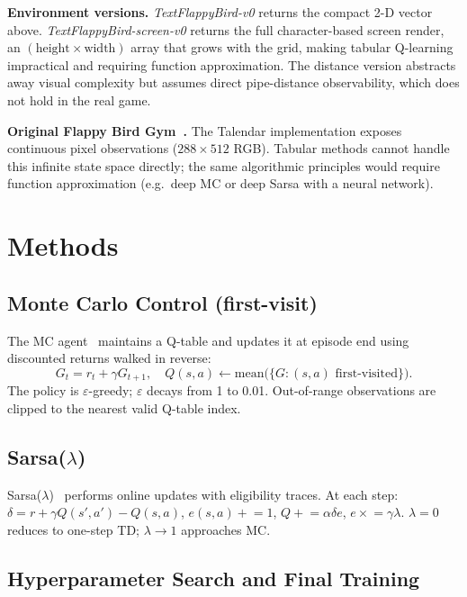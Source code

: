 \documentclass[runningheads]{llncs}
\begin{document}
\textbf{Environment versions.}
\emph{TextFlappyBird-v0} returns the compact 2-D vector above.
\emph{TextFlappyBird-screen-v0} returns the full character-based screen
render, an $(\text{height}\times\text{width})$ array that grows with the
grid, making tabular Q-learning impractical and requiring function
approximation.
The distance version abstracts away visual complexity but assumes direct
pipe-distance observability, which does not hold in the real game.

\textbf{Original Flappy Bird Gym~\cite{flappy_gym}.}
The Talendar implementation exposes continuous pixel observations
($288\!\times\!512$ RGB).
Tabular methods cannot handle this infinite state space directly; the same
algorithmic principles would require function approximation (e.g.\ deep MC
or deep Sarsa with a neural network).

\section{Methods}

\subsection{Monte Carlo Control (first-visit)}

The MC agent~\cite{sutton2018} maintains a Q-table and updates it at episode
end using discounted returns walked in reverse:
\[
  G_t = r_t + \gamma G_{t+1}, \quad
  Q(s,a) \leftarrow \mathrm{mean}\!\bigl(\{G : (s,a)\text{ first-visited}\}\bigr).
\]
The policy is $\varepsilon$-greedy; $\varepsilon$ decays from 1 to 0.01.
Out-of-range observations are clipped to the nearest valid Q-table index.

\subsection{Sarsa($\lambda$)}

Sarsa($\lambda$)~\cite{sutton2018} performs online updates with eligibility
traces. At each step:
$\delta = r + \gamma Q(s',a') - Q(s,a)$,
$e(s,a)\mathrel{+}=1$,
$Q\mathrel{+}=\alpha\delta e$,
$e\mathrel{\times}=\gamma\lambda$.
$\lambda=0$ reduces to one-step TD; $\lambda\to 1$ approaches MC.

\subsection{Hyperparameter Search and Final Training}
\end{document}
